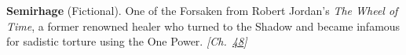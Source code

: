 \textbf{Semirhage} (Fictional). One of the Forsaken from Robert Jordan's \emph{The Wheel of Time}, a former renowned healer who turned to the Shadow and became infamous for sadistic torture using the One Power. \emph{[Ch.~\hyperref[ch:threebody]{48}]}

